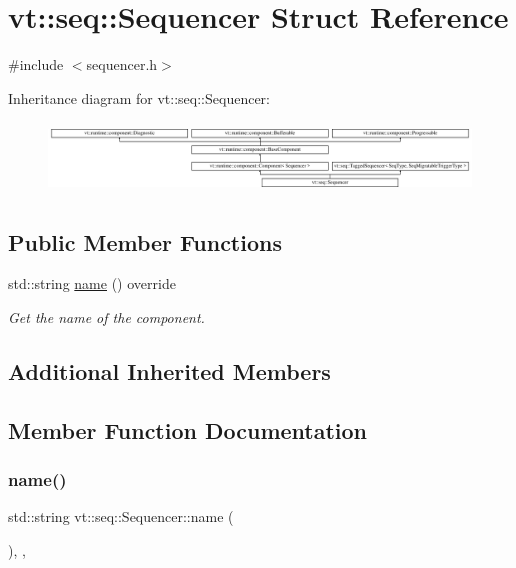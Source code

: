 \hypertarget{structvt_1_1seq_1_1_sequencer}{}\section{vt\+:\+:seq\+:\+:Sequencer Struct Reference}
\label{structvt_1_1seq_1_1_sequencer}


{\ttfamily \#include $<$sequencer.\+h$>$}

Inheritance diagram for vt\+:\+:seq\+:\+:Sequencer\+:\begin{figure}[H]
\begin{center}
\leavevmode
\includegraphics[height=1.885522cm]{structvt_1_1seq_1_1_sequencer}
\end{center}
\end{figure}
\subsection*{Public Member Functions}
\begin{DoxyCompactItemize}
\item 
std\+::string \hyperlink{structvt_1_1seq_1_1_sequencer_a18cbaabd9f1c5bf8d2f6a5c2e4ac5aaa}{name} () override
\begin{DoxyCompactList}\small\item\em Get the name of the component. \end{DoxyCompactList}\end{DoxyCompactItemize}
\subsection*{Additional Inherited Members}


\subsection{Member Function Documentation}
\mbox{\label{structvt_1_1seq_1_1_sequencer_a18cbaabd9f1c5bf8d2f6a5c2e4ac5aaa}} 
\subsubsection{\texorpdfstring{name()}{name()}}
{\footnotesize\ttfamily std\+::string vt\+::seq\+::\+Sequencer\+::name (\begin{DoxyParamCaption}{ }\end{DoxyParamCaption})\hspace{0.3cm}{\ttfamily [inline]}, {\ttfamily [override]}, {\ttfamily [virtual]}}



